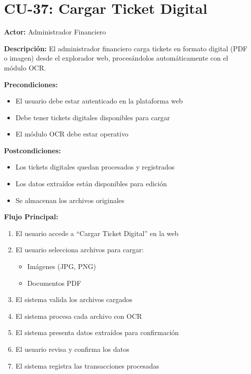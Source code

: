 \section{CU-37: Cargar Ticket Digital}

\noindent\textbf{Actor:} Administrador Financiero

\noindent\textbf{Descripción:} El administrador financiero carga tickets en formato digital (PDF o imagen) desde el explorador web, procesándolos automáticamente con el módulo OCR.

\noindent\textbf{Precondiciones:}
\begin{itemize}
    \item El usuario debe estar autenticado en la plataforma web
    \item Debe tener tickets digitales disponibles para cargar
    \item El módulo OCR debe estar operativo
\end{itemize}

\noindent\textbf{Postcondiciones:}
\begin{itemize}
    \item Los tickets digitales quedan procesados y registrados
    \item Los datos extraídos están disponibles para edición
    \item Se almacenan los archivos originales
\end{itemize}

\noindent\textbf{Flujo Principal:}
\begin{enumerate}
    \item El usuario accede a ``Cargar Ticket Digital'' en la web
    \item El usuario selecciona archivos para cargar:
    \begin{itemize}
        \item Imágenes (JPG, PNG)
        \item Documentos PDF
    \end{itemize}
    \item El sistema valida los archivos cargados
    \item El sistema procesa cada archivo con OCR
    \item El sistema presenta datos extraídos para confirmación
    \item El usuario revisa y confirma los datos
    \item El sistema registra las transacciones procesadas
\end{enumerate}

